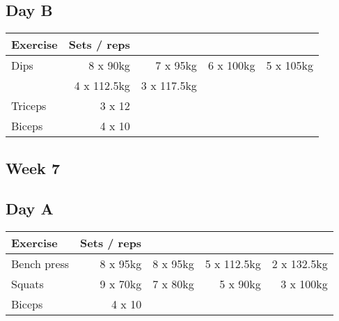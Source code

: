 \documentclass[12pt, a4paper]{article}%
\begin{document}
  \subsection*{\hspace{0.5em} Day B }


  \begin{tabular}{l|rrrr}
  \hspace{0.75em} \textbf{Exercise} & \textbf{Sets / reps} \\ \hline

            \hspace{0.75em} Dips
            & 8 x 90kg
            & 7 x 95kg
            & 6 x 100kg
            & 5 x 105kg
            \\


            \hspace{0.75em}
            & 4 x 112.5kg
            & 3 x 117.5kg
            & 
            & 
            \\


   \hspace{0.75em} Triceps & 3 x 12 \\
   \hspace{0.75em} Biceps & 4 x 10 \\
  \end{tabular}

 \subsection*{\hspace{0.25em} Week 7 }
  \subsection*{\hspace{0.5em} Day A }


  \begin{tabular}{l|rrrr}
  \hspace{0.75em} \textbf{Exercise} & \textbf{Sets / reps} \\ \hline

            \hspace{0.75em} Bench press
            & 8 x 95kg
            & 8 x 95kg
            & 5 x 112.5kg
            & 2 x 132.5kg
            \\


            \hspace{0.75em} Squats
            & 9 x 70kg
            & 7 x 80kg
            & 5 x 90kg
            & 3 x 100kg
            \\


   \hspace{0.75em} Biceps & 4 x 10 \\
  \end{tabular}
\end{document}
